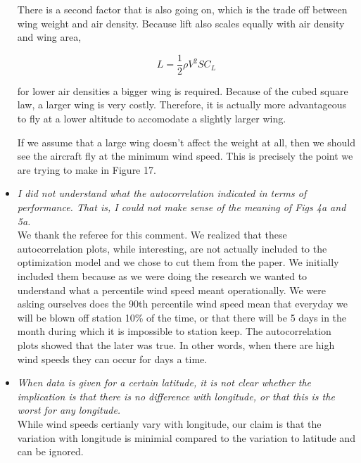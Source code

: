 \documentclass[10pt, a4paper]{article}
\begin{document}
\begin{itemize}
    There is a second factor that is also going on, which is the trade off between wing weight and air density.  Because lift also scales equally with air density and wing area, 

    \begin{equation}
        L = \frac{1}{2} \rho V^2 S C_L
    \end{equation}

    for lower air densities a bigger wing is required.  Because of the cubed square law, a larger wing is very costly.  Therefore, it is actually more advantageous to fly at a lower altitude to accomodate a slightly larger wing.  

    If we assume that a large wing doesn't affect the weight at all, then we should see the aircraft fly at the minimum wind speed.  This is precisely the point we are trying to make in Figure 17.  \\

    \item \emph{I did not understand what the autocorrelation indicated in terms of performance. That is, I could not make sense of the meaning of Figs 4a and 5a.}  \\
We thank the referee for this comment.  We realized that these autocorrelation plots, while interesting, are not actually included to the optimization model and we chose to cut them from the paper.  
We initially included them because as we were doing the research we wanted to understand what a percentile wind speed meant operationally.  
We were asking ourselves does the 90th percentile wind speed mean that everyday we will be blown off station 10\% of the time, or that there will be 5 days in the month during which it is impossible to station keep.  
The autocorrelation plots showed that the later was true.  In other words, when there are high wind speeds they can occur for days a time. \\

    \item \emph{When data is given for a certain latitude, it is not clear whether the implication is that there is no difference with longitude, or that this is the worst for any longitude.} \\
While wind speeds certianly vary with longitude, our claim is that the variation with longitude is minimial compared to the variation to latitude and can be ignored.  \\

    \end{itemize}
\end{document}
